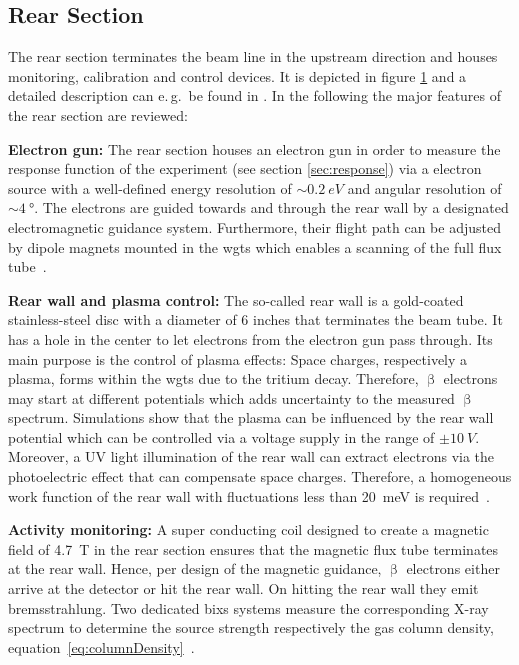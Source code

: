 \subsection{Rear Section}
\label{sec:katrinExpSetupRearSection}
\begin{figure}[t]
 \label{fig:rearSection}
\end{figure}

The rear section terminates the beam line in the upstream direction and houses monitoring, calibration and control devices. It is depicted in figure \ref{fig:rearSection} and a detailed description can e.\,g.~be found in \cite{Babutzka2014}. In the following the major features of the rear section are reviewed:

{\par\textbf{Electron gun:}
The rear section houses an electron gun in order to measure the response function of the experiment (see section \ref{sec:response}) via a electron source with a well-defined energy resolution of $\sim \SI{0.2}{eV}$ and angular resolution of $\sim \SI{4}{\degree}$. The electrons are guided towards and through the rear wall by a designated electromagnetic guidance system. Furthermore, their flight path can be adjusted by dipole magnets mounted in the \gls{wgts} which enables a scanning of the full flux tube~\cite{Babutzka2014}.}

{\par \textbf{Rear wall and plasma control:}
The so-called rear wall is a gold-coated stainless-steel disc with a diameter of 6 inches that terminates the beam tube. It has a hole in the center to let electrons from the electron gun pass through. Its main purpose is the control of plasma effects: Space charges, respectively a plasma, forms within the \gls{wgts} due to the tritium decay. Therefore, $\upbeta$ electrons may start at different potentials which adds uncertainty to the measured $\upbeta$ spectrum. Simulations show that the plasma can be influenced by the rear wall potential which can be controlled via a voltage supply in the range of $\pm \SI{10}{V}$. Moreover, a UV light illumination of the rear wall can extract electrons via the photoelectric effect that can compensate space charges. Therefore, a homogeneous work function of the rear wall with fluctuations less than \SI{20}{meV} is required~\cite{Kuckert2018, Kuckert2016}.}

{\par\textbf{Activity monitoring:}
A super conducting coil designed to create a magnetic field of \SI{4.7}{T} in the rear section ensures that the magnetic flux tube terminates at the rear wall. Hence, per design of the magnetic guidance, $\upbeta$ electrons either arrive at the detector or hit the rear wall. On hitting the rear wall they emit bremsstrahlung. Two dedicated \gls{bixs} systems measure the corresponding X-ray spectrum to determine the source strength respectively the gas column density, equation~\eqref{eq:columnDensity}~\cite{Roellig2015}.}
